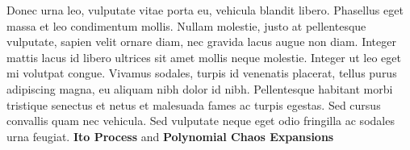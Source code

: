 Donec urna leo, vulputate vitae porta eu, vehicula blandit libero. Phasellus eget massa et leo condimentum mollis. Nullam molestie, justo at pellentesque vulputate, sapien velit ornare diam, nec gravida lacus augue non diam. Integer mattis lacus id libero ultrices sit amet mollis neque molestie. Integer ut leo eget mi volutpat congue. Vivamus sodales, turpis id venenatis placerat, tellus purus adipiscing magna, eu aliquam nibh dolor id nibh. Pellentesque habitant morbi tristique senectus et netus et malesuada fames ac turpis egestas. Sed cursus convallis quam nec vehicula. Sed vulputate neque eget odio fringilla ac sodales urna feugiat.
\textbf{Ito Process} and \textbf{Polynomial Chaos Expansions}
